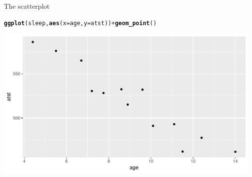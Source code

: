 \documentclass[unknownkeysallowed]{beamer}\usepackage[]{graphicx}\usepackage[]{color}
\makeatletter
\def\maxwidth{ %
  \ifdim\Gin@nat@width>\linewidth
    \linewidth
  \else
    \Gin@nat@width
  \fi
}
\newcommand{\hlopt}[1]{\textcolor[rgb]{0,0,0}{#1}}%
\newcommand{\hlstd}[1]{\textcolor[rgb]{0.345,0.345,0.345}{#1}}%
\newcommand{\hlkwc}[1]{\textcolor[rgb]{0.333,0.667,0.333}{#1}}%
\newcommand{\hlkwd}[1]{\textcolor[rgb]{0.737,0.353,0.396}{\textbf{#1}}}%
\newenvironment{kframe}{%
 \def\at@end@of@kframe{}%
 \ifinner\ifhmode%
  \def\at@end@of@kframe{\end{minipage}}%
  \begin{minipage}{\columnwidth}%
 \fi\fi%
 \def\FrameCommand##1{\hskip\@totalleftmargin \hskip-\fboxsep
 \colorbox{shadecolor}{##1}\hskip-\fboxsep
     \hskip-\linewidth \hskip-\@totalleftmargin \hskip\columnwidth}%
 \MakeFramed {\advance\hsize-\width
   \@totalleftmargin\z@ \linewidth\hsize
   \@setminipage}}%
 {\par\unskip\endMakeFramed%
 \at@end@of@kframe}
\newenvironment{knitrout}{}{} %
\makeatother
\begin{document}
\begin{frame}[fragile]{The scatterplot}
   
\begin{knitrout}
\color{fgcolor}\begin{kframe}
\begin{alltt}
\hlkwd{ggplot}\hlstd{(sleep,}\hlkwd{aes}\hlstd{(}\hlkwc{x}\hlstd{=age,}\hlkwc{y}\hlstd{=atst))}\hlopt{+}\hlkwd{geom_point}\hlstd{()}
\end{alltt}
\end{kframe}
\includegraphics[width=\maxwidth]{figure/suggo-1} 

\end{knitrout}
  
  

\end{frame}
\end{document}
